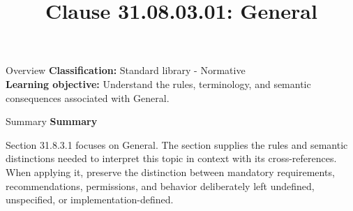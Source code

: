 \documentclass[10pt,letterpaper]{article}
\title{Clause 31.08.03.01: General}
\author{}
\date{}
\begin{document}
\maketitle
\begin{CornellOverviewBox}{Overview}
\textbf{Classification:} Standard library - Normative\\[2pt]
\textbf{Learning objective:} Understand the rules, terminology, and semantic consequences associated with General.
\end{CornellOverviewBox}\begin{CornellSummaryBox}{Summary}
{\sffamily\bfseries\color{Accent} Summary}\par\vspace{3pt}Section 31.8.3.1 focuses on General. The section supplies the rules and semantic distinctions needed to interpret this topic in context with its cross-references. When applying it, preserve the distinction between mandatory requirements, recommendations, permissions, and behavior deliberately left undefined, unspecified, or implementation-defined.
\end{CornellSummaryBox}
\end{document}
